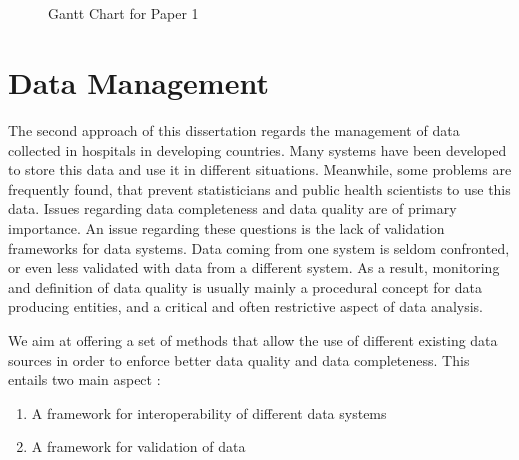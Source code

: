 \documentclass[a4paper,11pt,final,twoside]{article}
\begin{document}
\begin{figure}[h]
\begin{ganttchart}{1}{24}
 \\
 \\
 \\
 \\
 \\
 \\
 \\
 \\
 \\
\end{ganttchart}
\caption{Gantt Chart for Paper 1}
\end{figure}


\section{Data Management}

The second approach of this dissertation regards the management of data collected in hospitals in developing countries. Many systems have been developed to store this data and use it in different situations. Meanwhile, some problems are frequently found, that prevent statisticians and public health scientists to use this data. Issues regarding data completeness and data quality are of primary importance. An issue regarding these questions is the lack of validation frameworks for data systems. Data coming from one system is seldom confronted, or even less validated with data from a different system. As a result, monitoring and definition of data quality is usually mainly a procedural concept for data producing entities, and a critical and often restrictive aspect of data analysis.

We aim at offering a set of methods that allow the use of different existing data sources in order to enforce better data quality and data completeness. This entails two main aspect :

\begin{enumerate}
\item A framework for interoperability of different data systems
\item A framework for validation of data
\end{enumerate}
\end{document}
